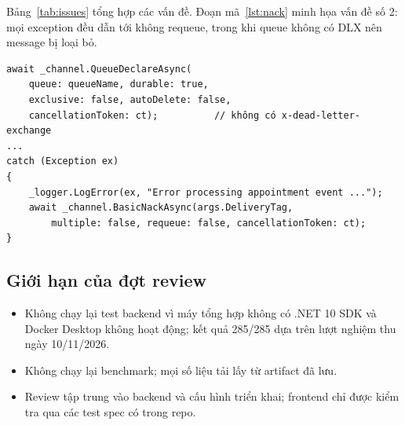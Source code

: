 Bảng~\ref{tab:issues} tổng hợp các vấn đề. Đoạn mã~\ref{lst:nack} minh họa vấn đề số 2: mọi exception đều dẫn tới  không requeue, trong khi queue không có DLX nên message bị loại bỏ.

\begin{lstlisting}[language={[Sharp]C}]
await _channel.QueueDeclareAsync(
    queue: queueName, durable: true,
    exclusive: false, autoDelete: false,
    cancellationToken: ct);          // không có x-dead-letter-exchange
...
catch (Exception ex)
{
    _logger.LogError(ex, "Error processing appointment event ...");
    await _channel.BasicNackAsync(args.DeliveryTag,
        multiple: false, requeue: false, cancellationToken: ct);
}
\end{lstlisting}

\subsection{Giới hạn của đợt review}

\begin{itemize}
  \item Không chạy lại test backend vì máy tổng hợp không có .NET 10 SDK và Docker Desktop không hoạt động; kết quả 285/285 dựa trên lượt nghiệm thu ngày 10/11/2026.
  \item Không chạy lại benchmark; mọi số liệu tải lấy từ artifact đã lưu.
  \item Review tập trung vào backend và cấu hình triển khai; frontend chỉ được kiểm tra qua các test spec có trong repo.
\end{itemize}
